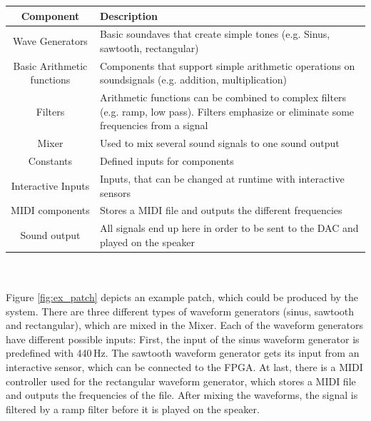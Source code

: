 	 \begin{tabular}[h]{|c|p{9.75cm}|}
	  \hline
	  Component & Description \\
	  \hline
	  \hline
	  Wave Generators & Basic soundaves that create simple tones (e.g. Sinus, sawtooth, rectangular) \\\hline
		Basic Arithmetic functions & Components that support simple arithmetic operations on soundsignals (e.g. addition, multiplication)\\\hline
		Filters & Arithmetic functions can be combined to complex filters (e.g. ramp, low pass). Filters emphasize or eliminate some frequencies from a signal \\\hline
		Mixer & Used to mix several sound signals to one sound output \\\hline
		Constants & Defined inputs for components \\\hline
		Interactive Inputs & Inputs, that can be changed at runtime with interactive sensors \\\hline
		MIDI components & Stores a MIDI file and outputs the different frequencies \\\hline
		Sound output & All signals end up here in order to be sent to the \ac{DAC} and played on the speaker \\\hline
	 \end{tabular}
\\\\


Figure \ref{fig:ex_patch} depicts an example patch, which could be produced by the system. There are three different types of waveform generators (sinus, sawtooth and rectangular), which are mixed in the Mixer. Each of the waveform generators have different possible inputs: First, the input of the sinus waveform generator is predefined with 440\,Hz. The sawtooth waveform generator gets its input from an interactive sensor, which can be connected to the \ac{FPGA}. At last, there is a MIDI controller used for the rectangular waveform generator, which stores a MIDI file and outputs the frequencies of the file.
After mixing the waveforms, the signal is filtered by a ramp filter before it is played on the speaker.

